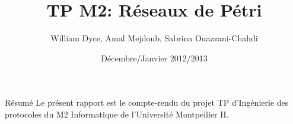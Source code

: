 \documentclass[a4paper, 12pt]{article}
\title{TP M2: Réseaux de Pétri} \author{William Dyce, Amal Mejdoub, Sabrina Ouazzani-Chahdi}
\date{Décembre/Janvier 2012/2013}
\begin{document}
\newcommand\bcdef{\texttt{[image: def.png]}}

\maketitle

\begin{bclogo}[couleur=blue!15, arrondi=0.1, logo= \bcdef,
    ombre=true, epOmbre=0.25, couleurOmbre=black!30, epBarre=1,
    barre=zigzag]{Résumé} Le présent rapport est le compte-rendu du
  projet TP d'Ingénierie des protocoles du M2 Informatique de
  l'Université Montpellier II.
\end{bclogo}


\pagebreak

\pagebreak

\pagebreak

\pagebreak

\pagebreak

\pagebreak

\pagebreak

\end{document}
